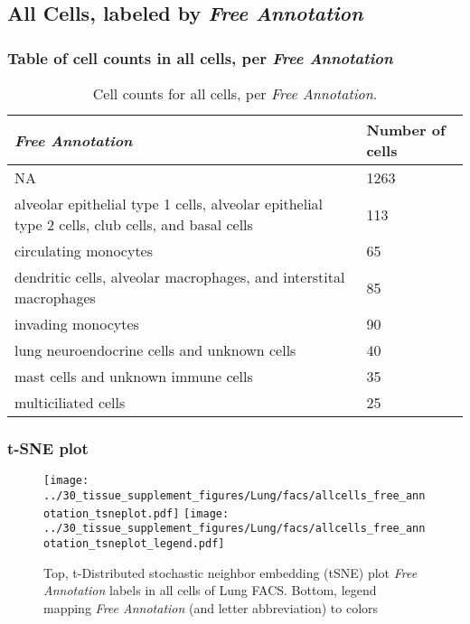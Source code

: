 \subsection{All Cells, labeled by \emph{Free Annotation}}
\subsubsection{Table of cell counts in all cells, per \emph{Free Annotation}}\begin{table}[h]
\centering
\label{my-label}
\begin{tabular}{@{}ll@{}}
\toprule

\emph{Free Annotation}& Number of cells \\ \midrule
NA & 1263 \\

alveolar epithelial type 1 cells, alveolar epithelial type 2 cells, club cells, and basal cells & 113 \\

circulating monocytes & 65 \\

dendritic cells, alveolar macrophages, and interstital macrophages & 85 \\

invading monocytes & 90 \\

lung neuroendocrine cells and unknown cells & 40 \\

mast cells and unknown immune cells & 35 \\

multiciliated cells & 25 \\
\bottomrule
\end{tabular}
\caption{Cell counts for all cells, per \emph{Free Annotation}.}
\end{table}

\clearpage
\subsubsection{t-SNE plot}
\begin{figure}[h]
\centering
\texttt{[image: ../30\_tissue\_supplement\_figures/Lung/facs/allcells\_free\_annotation\_tsneplot.pdf]}
\texttt{[image: ../30\_tissue\_supplement\_figures/Lung/facs/allcells\_free\_annotation\_tsneplot\_legend.pdf]}
\caption{Top, t-Distributed stochastic neighbor embedding (tSNE) plot  \emph{Free Annotation} labels in all cells of Lung FACS. Bottom, legend mapping \emph{Free Annotation} (and letter abbreviation) to colors}
\end{figure}


